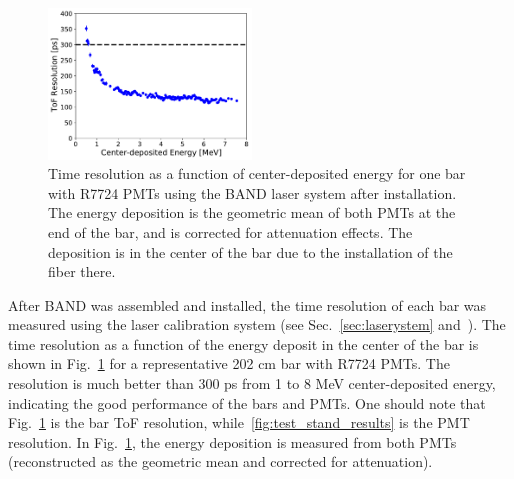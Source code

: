 \documentclass[3p,twocolumn]{elsarticle}
\begin{document}
\begin{figure}[tb]
	\centering
		\includegraphics[width=0.48\textwidth]{fig7-laser-response.pdf}
		\caption{Time resolution as a function of center-deposited energy for one bar with R7724 PMTs using the
                  BAND laser system after installation. The energy deposition is the geometric mean of both PMTs at the
                  end of the bar, and is corrected for attenuation effects. The deposition is in the center of the bar due to the installation of the fiber there.}
         \label{fig:resolution-laser}
\end{figure}

After BAND was assembled and installed, the time resolution of each bar was measured using the laser calibration system (see Sec.~\ref{sec:laserystem} and~\cite{band-laser}). The time resolution as a function of the energy deposit in the center of the bar
is shown in Fig.~\ref{fig:resolution-laser} for a representative 202 \si{\centi\meter} bar 
with R7724 PMTs. The resolution is much better than 300
\si{\pico\s} from 1 to 8 \si{\mega\electronvolt} center-deposited energy, 
indicating the good performance of the bars and PMTs. One should note that 
Fig.~\ref{fig:resolution-laser} is the bar ToF resolution, while~\ref{fig:test_stand_results} is the PMT resolution. In Fig.~\ref{fig:resolution-laser}, the energy deposition is measured from both PMTs (reconstructed as the 
geometric mean and corrected for attenuation). 
\end{document}
